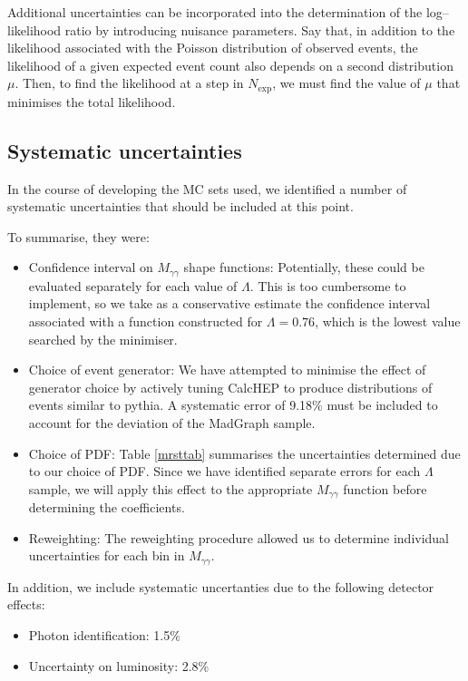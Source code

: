 Additional uncertainties can be incorporated into the determination of the log--likelihood ratio by introducing nuisance parameters. Say that, in addition to the likelihood associated with the Poisson distribution of observed events, the likelihood of a given expected event count also depends on a second distribution $\mu$. Then, to find the likelihood at a step in $N_\text{exp}$, we must find the value of $\mu$ that minimises the total likelihood.

\subsection{Systematic uncertainties}
In the course of developing the MC sets used, we identified a number of systematic uncertainties that should be included at this point.

To summarise, they were:
\begin{itemize}
\item Confidence interval on $M_{\gamma\gamma}$ shape functions: Potentially, these could be evaluated separately for each value of $\Lambda$. This is too cumbersome to implement, so we take as a conservative estimate the confidence interval associated with a function constructed for $\Lambda=0.76$, which is the lowest value searched by the minimiser.
\item Choice of event generator: We have attempted to minimise the effect of generator choice by actively tuning CalcHEP to produce distributions of events similar to pythia. A systematic error of 9.18\% must be included to account for the deviation of the MadGraph sample.
\item Choice of PDF: Table \ref{mrsttab} summarises the uncertainties determined due to our choice of PDF. Since we have identified separate errors for each $\Lambda$ sample, we will apply this effect to the appropriate $M_{\gamma\gamma}$ function before determining the coefficients.
\item Reweighting: The reweighting procedure allowed us to determine individual uncertainties for each bin in $M_{\gamma\gamma}$.
\end{itemize}
In addition, we include systematic uncertanties due to the following detector effects:
\begin{itemize}
\item Photon identification: 1.5\%
\item Uncertainty on luminosity: 2.8\%
\end{itemize}

